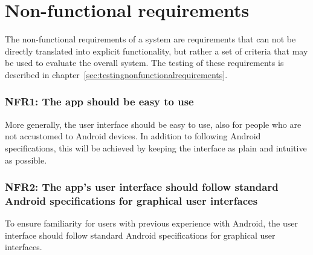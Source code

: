 \section{Non-functional requirements}
\label{sec:nonFunctionalReq}
The non-functional requirements of a system are requirements that can not be directly translated into explicit functionality, but rather a set of criteria that may be used to evaluate the overall system. The testing of these requirements is described in chapter~\ref{sec:testingnonfunctionalrequirements}.

\subsubsection{NFR1: The app should be easy to use}
More generally, the user interface should be easy to use, also for people who are not accustomed to Android devices. In addition to following Android specifications, this will be achieved by keeping the interface as plain and intuitive as possible. 

\subsubsection{NFR2: The app's user interface should follow standard Android specifications for graphical user interfaces}
To ensure familiarity for users with previous experience with Android, the user interface should follow standard Android specifications for graphical user interfaces.
 
\begin{comment}

\subsubsection{NFR2: Installation guide and documentation}
The system should come with a comprehensive guide to using the system. This should include documentation for operation of the
app along with a guide to what the rest of the system operates. As the team will not be developing hardware for metering and 
aggregating data from homes, the main focus will be on the app and the team's central server. The documentation will contain an outline 
of the intended architecture for the rest of the system.


\begin{itemize}
\item The user interface should follow standard Android specifications. 
\item The applification should not need a lot of extra material to get started (Power devices, own server).
\end{itemize}

\end{comment}
